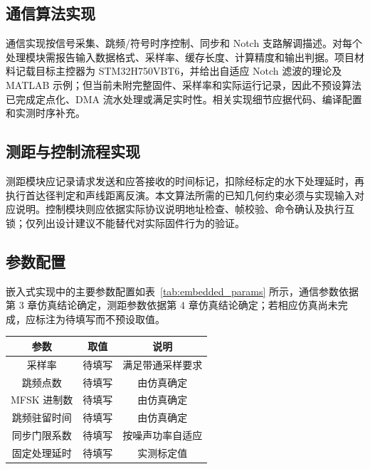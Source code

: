 \subsection{通信算法实现}

通信实现按信号采集、跳频/符号时序控制、同步和 Notch 支路解调描述。对每个处理模块需报告输入数据格式、采样率、缓存长度、计算精度和输出判据。项目材料记载目标主控器为 STM32H750VBT6，并给出自适应 Notch 滤波的理论及 MATLAB 示例；但当前未附完整固件、采样率和实际运行记录，因此不预设算法已完成定点化、DMA 流水处理或满足实时性。相关实现细节应据代码、编译配置和实测时序补充。

\subsection{测距与控制流程实现}

测距模块应记录请求发送和应答接收的时间标记，扣除经标定的水下处理延时，再执行首达径判定和声线距离反演。本文算法所需的已知几何约束必须与实现输入对应说明。控制模块则应依据实际协议说明地址检查、帧校验、命令确认及执行互锁；仅列出设计建议不能替代对实际固件行为的验证。

\subsection{参数配置}

嵌入式实现中的主要参数配置如表~\ref{tab:embedded_params} 所示，通信参数依据第 3 章仿真结论确定，测距参数依据第 4 章仿真结论确定；若相应仿真尚未完成，应标注为待填写而不预设取值。

\begin{table}[htbp]
  \vspace{0.5em}\centering\wuhao
  \begin{tabular}{ccc}
    \toprule[1.5pt]
    参数 & 取值 & 说明 \\
    \midrule[1pt]
    采样率 & 待填写 & 满足带通采样要求 \\
    跳频点数 & 待填写 & 由仿真确定 \\
    MFSK 进制数 & 待填写 & 由仿真确定 \\
    跳频驻留时间 & 待填写 & 由仿真确定 \\
    同步门限系数 & 待填写 & 按噪声功率自适应 \\
    固定处理延时 & 待填写 & 实测标定值 \\
    \bottomrule[1.5pt]
  \end{tabular}
\end{table}

